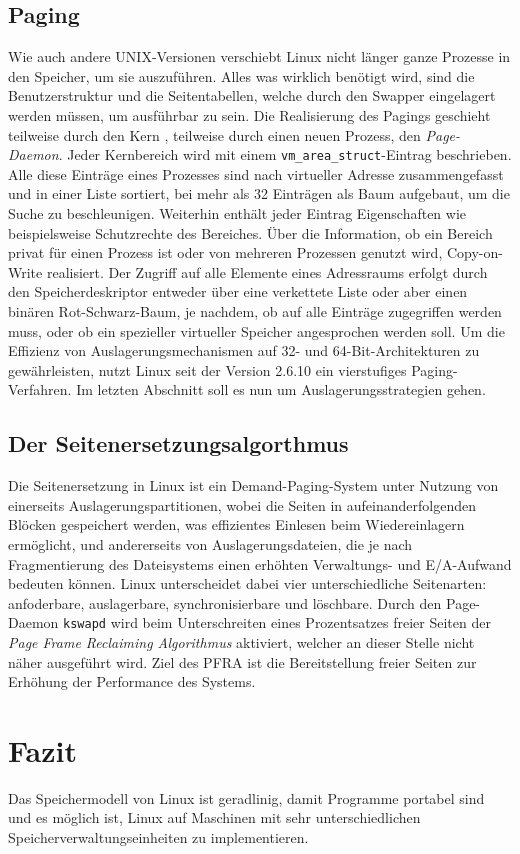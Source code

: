 \documentclass[11pt,a4paper]{article}
\begin{document}
\subsection*{Paging}
Wie auch andere UNIX-Versionen verschiebt Linux nicht länger ganze Prozesse in den Speicher, um sie auszuführen. Alles was wirklich benötigt wird, sind die Benutzerstruktur und die Seitentabellen, welche durch den Swapper eingelagert werden müssen, um ausführbar zu sein. Die Realisierung des Pagings geschieht teilweise durch den Kern , teilweise durch einen neuen Prozess, den \textit{Page-Daemon}. Jeder Kernbereich wird mit einem \texttt{vm\_area\_struct}-Eintrag beschrieben. Alle diese Einträge eines Prozesses sind nach virtueller Adresse zusammengefasst und in einer Liste sortiert, bei mehr als 32 Einträgen als Baum aufgebaut, um die Suche zu beschleunigen. Weiterhin enthält jeder Eintrag Eigenschaften wie beispielsweise Schutzrechte des Bereiches. Über die Information, ob ein Bereich privat für einen Prozess ist oder von mehreren Prozessen genutzt wird, Copy-on-Write realisiert. Der Zugriff auf alle Elemente eines Adressraums erfolgt durch den Speicherdeskriptor entweder über eine verkettete Liste oder aber einen binären Rot-Schwarz-Baum, je nachdem, ob auf alle Einträge zugegriffen werden muss, oder ob ein spezieller virtueller Speicher angesprochen werden soll. 
\newline
Um die Effizienz von Auslagerungsmechanismen auf 32- und 64-Bit-Architekturen zu gewährleisten, nutzt Linux seit der Version 2.6.10 ein vierstufiges Paging-Verfahren. Im letzten Abschnitt soll es nun um Auslagerungsstrategien gehen.

\subsection*{Der Seitenersetzungsalgorthmus}
Die Seitenersetzung in Linux ist ein Demand-Paging-System unter Nutzung von einerseits  Auslagerungspartitionen, wobei die Seiten in aufeinanderfolgenden Blöcken gespeichert werden, was effizientes Einlesen beim Wiedereinlagern ermöglicht, und andererseits von Auslagerungsdateien, die je nach Fragmentierung des Dateisystems einen erhöhten Verwaltungs- und E/A-Aufwand bedeuten können.  Linux unterscheidet dabei vier unterschiedliche Seitenarten: anfoderbare, auslagerbare, synchronisierbare und löschbare. Durch den Page-Daemon \texttt{kswapd} wird beim Unterschreiten eines Prozentsatzes freier Seiten der \textit{Page Frame Reclaiming Algorithmus} aktiviert, welcher an dieser Stelle nicht näher ausgeführt wird. Ziel des PFRA ist die Bereitstellung freier Seiten zur Erhöhung der Performance des Systems.

\section*{Fazit}
\glqq Das Speichermodell von Linux ist geradlinig, damit Programme portabel sind und es möglich ist, Linux auf Maschinen mit sehr unterschiedlichen Speicherverwaltungseinheiten zu implementieren.\grqq
\end{document}
